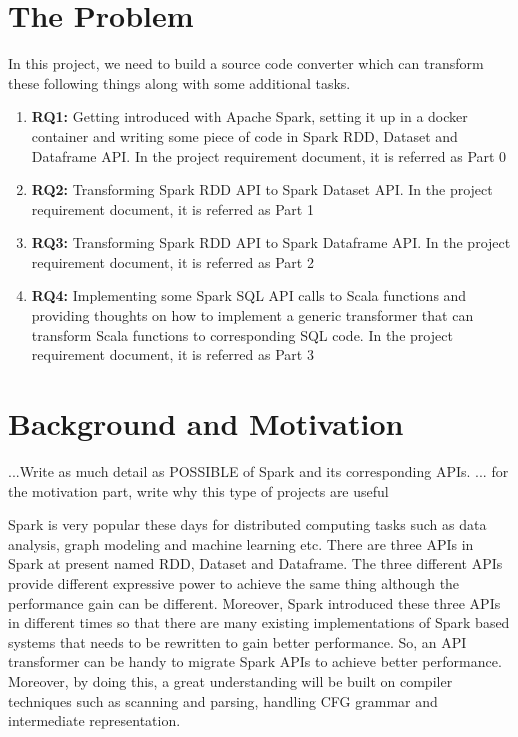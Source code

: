 \documentclass[sigplan]{acmart}\settopmatter{printfolios=true,printccs=false,printacmref=false}
\begin{document}
\section{The Problem}
In this project, we need to build a source code converter which can transform these following things along with some additional tasks. 
\begin{enumerate}
	\item \textbf{RQ1:} Getting introduced with Apache Spark, setting it up in a docker container and writing some piece of code in Spark RDD, Dataset and Dataframe API. In the project requirement document, it is referred as Part 0
	\item \textbf{RQ2:} Transforming Spark RDD API to Spark Dataset API. In the project requirement document, it is referred as Part 1
	\item \textbf{RQ3:} Transforming Spark RDD API to Spark Dataframe API. In the project requirement document, it is referred as Part 2
	\item \textbf{RQ4:} Implementing some Spark SQL API calls to Scala functions and providing thoughts on how to implement a generic transformer that can transform Scala functions to corresponding SQL code.  In the project requirement document, it is referred as Part 3
\end{enumerate}

\section{Background and Motivation}
...Write as much detail as POSSIBLE of Spark and its corresponding APIs.
... for the motivation part, write why this type of projects are useful

Spark is very popular these days for distributed computing tasks such as data analysis, graph modeling and machine learning etc. There are three APIs in Spark at present named RDD, Dataset and Dataframe. The three different APIs provide different expressive power to achieve the same thing although the performance gain can be different. Moreover, Spark introduced these three APIs in different times so that there are many existing implementations of Spark based systems that needs to be rewritten to gain better performance. So, an API transformer can be handy to migrate Spark APIs to achieve better performance. Moreover, by doing this, a great understanding will be built on compiler techniques such as scanning and parsing, handling CFG grammar and intermediate representation.  
\end{document}
